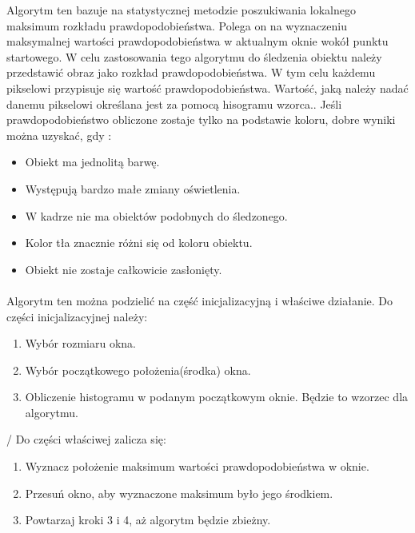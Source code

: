Algorytm ten bazuje na statystycznej metodzie poszukiwania lokalnego maksimum rozkładu prawdopodobieństwa. 
Polega on na wyznaczeniu maksymalnej wartości prawdopodobieństwa w aktualnym oknie wokół punktu startowego.
W celu zastosowania tego algorytmu do śledzenia obiektu należy przedstawić obraz jako rozkład prawdopodobieństwa.
W tym celu każdemu pikselowi przypisuje się wartość prawdopodobieństwa.
Wartość, jaką należy nadać danemu pikselowi określana jest za pomocą hisogramu wzorca.\cite{CMS}.
Jeśli prawdopodobieństwo obliczone zostaje tylko na podstawie koloru, dobre wyniki można uzyskać, gdy \cite{CMS}:
\begin{itemize}
\item Obiekt ma jednolitą barwę.
\item Występują bardzo małe zmiany oświetlenia.
\item W kadrze nie ma obiektów podobnych do śledzonego.
\item Kolor tła znacznie różni się od koloru obiektu.
\item Obiekt nie zostaje całkowicie zasłonięty.
\end{itemize}
\paragraph*{}
Algorytm ten można podzielić na część inicjalizacyjną i właściwe działanie. Do części inicjalizacyjnej należy:
\begin{enumerate}
\item Wybór rozmiaru okna.
\item Wybór początkowego położenia(środka) okna.
\item Obliczenie histogramu w podanym początkowym oknie. Będzie to wzorzec dla algorytmu.
\end{enumerate}/
Do części właściwej zalicza się:
\begin{enumerate}
\item Wyznacz położenie maksimum wartości prawdopodobieństwa w oknie.
\item Przesuń okno, aby wyznaczone maksimum było jego środkiem.
\item Powtarzaj kroki 3 i 4, aż algorytm będzie zbieżny.
\end{enumerate}
